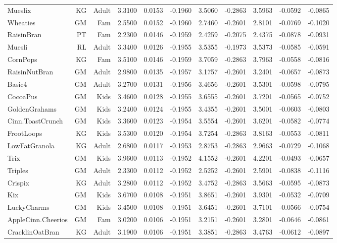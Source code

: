 \begin{longtable}{@{}lrrrrrrrrrr@{}}
Mueslix & KG & Adult & 3.3100 & 0.0153 & -0.1960 & 3.5060 & -0.2863 & 3.5963 & -0.0592 & -0.0865 \\
Wheaties & GM & Fam & 2.5500 & 0.0152 & -0.1960 & 2.7460 & -0.2601 & 2.8101 & -0.0769 & -0.1020 \\
RaisinBran & PT & Fam & 2.2300 & 0.0146 & -0.1959 & 2.4259 & -0.2075 & 2.4375 & -0.0878 & -0.0931 \\
Muesli & RL & Adult & 3.3400 & 0.0126 & -0.1955 & 3.5355 & -0.1973 & 3.5373 & -0.0585 & -0.0591 \\
CornPops & KG & Fam & 3.5100 & 0.0146 & -0.1959 & 3.7059 & -0.2863 & 3.7963 & -0.0558 & -0.0816 \\
RaisinNutBran & GM & Adult & 2.9800 & 0.0135 & -0.1957 & 3.1757 & -0.2601 & 3.2401 & -0.0657 & -0.0873 \\
Basic4 & GM & Adult & 3.2700 & 0.0131 & -0.1956 & 3.4656 & -0.2601 & 3.5301 & -0.0598 & -0.0795 \\
CocoaPus & GM & Kids & 3.4600 & 0.0128 & -0.1955 & 3.6555 & -0.2601 & 3.7201 & -0.0565 & -0.0752 \\
GoldenGrahams & GM & Kids & 3.2400 & 0.0124 & -0.1955 & 3.4355 & -0.2601 & 3.5001 & -0.0603 & -0.0803 \\
Cinn.ToastCrunch & GM & Kids & 3.3600 & 0.0123 & -0.1954 & 3.5554 & -0.2601 & 3.6201 & -0.0582 & -0.0774 \\
FrootLoops & KG & Kids & 3.5300 & 0.0120 & -0.1954 & 3.7254 & -0.2863 & 3.8163 & -0.0553 & -0.0811 \\
LowFatGranola & KG & Adult & 2.6800 & 0.0117 & -0.1953 & 2.8753 & -0.2863 & 2.9663 & -0.0729 & -0.1068 \\
Trix & GM & Kids & 3.9600 & 0.0113 & -0.1952 & 4.1552 & -0.2601 & 4.2201 & -0.0493 & -0.0657 \\
Triples & GM & Adult & 2.3300 & 0.0112 & -0.1952 & 2.5252 & -0.2601 & 2.5901 & -0.0838 & -0.1116 \\
Crispix & KG & Adult & 3.2800 & 0.0112 & -0.1952 & 3.4752 & -0.2863 & 3.5663 & -0.0595 & -0.0873 \\
Kix & GM & Kids & 3.6700 & 0.0108 & -0.1951 & 3.8651 & -0.2601 & 3.9301 & -0.0532 & -0.0709 \\
LuckyCharms & GM & Kids & 3.4500 & 0.0108 & -0.1951 & 3.6451 & -0.2601 & 3.7101 & -0.0566 & -0.0754 \\
AppleCinn.Cheerios & GM & Fam & 3.0200 & 0.0106 & -0.1951 & 3.2151 & -0.2601 & 3.2801 & -0.0646 & -0.0861 \\
CracklinOatBran & KG & Adult & 3.1900 & 0.0106 & -0.1951 & 3.3851 & -0.2863 & 3.4763 & -0.0612 & -0.0897 \\

\end{longtable}

